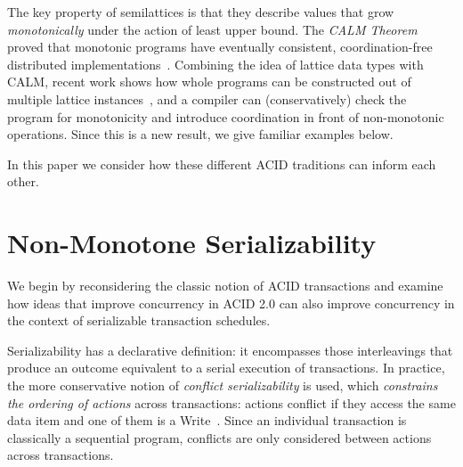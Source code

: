 \documentclass{sig-alternate}
\newcommand{\jmh}[1]{{\textcolor{red}{#1 -- jmh}}}
\newcommand{\paa}[1]{{\textcolor{blue}{[[#1 -- paa]]}}}
\begin{document}
The key property of semilattices is that they describe values that grow
\emph{monotonically} under the action of least upper bound.  The \emph{CALM
  Theorem} proved that monotonic programs have eventually consistent,
coordination-free distributed
implementations~\cite{Alvaro2011,Ameloot2011,Hellerstein2010}.  Combining the
idea of lattice data types with CALM, recent work shows how whole programs can
be constructed out of multiple lattice instances~\cite{Conway2012}, and a
compiler can (conservatively) check the program for monotonicity and introduce
coordination in front of non-monotonic operations.  Since this is a new result,
we give familiar examples below.

In this paper we consider how these different ACID traditions can inform each
other.

\begin{comment}
At the risk of over-simplifying, ACID transactions are often thought of
as an \emph{inter-transaction} approach, realized by \emph{enforcing an order}
that satisfies serializability.  ACID 2.0 can be thought of as an
\emph{intra-transaction} approach that \emph{tolerates disorder} when
non-deterministic orders result in deterministic outcomes.  This is not a
precise characterization as we discuss below, but it is useful for framing
discussion.  \paa{I am not sure I get/buy the inter vs. intra dichotomy.  it
  seems to me that the transactional abstraction lets you write ordered programs
  and gives a guarantee of an *extension* of that order in a "correct" global
  schedule, whereas calm asks for unordered programs and in return gives correct
  executions.  *both* allow the programmer to not explicitly reason about
  inter-xact interleavings.} \jmh{Are you equating CALM with pure monotonicity?
  Because Bloom, with non-monotonicity, does not help reasoning transactionally.
  As I discuss below, pure monotonicity is trivially serializable, but that
  doesn't really help think about most transactions.}
\end{comment}

\section{Non-Monotone Serializability}
We begin by reconsidering the classic notion of ACID transactions and examine
how ideas that improve concurrency in ACID 2.0 can also improve concurrency in
the context of serializable transaction schedules.

Serializability has a declarative definition: it encompasses those interleavings
that produce an outcome equivalent to a serial execution of transactions.  In
practice, the more conservative notion of \emph{conflict serializability} is
used, which \emph{constrains the ordering of actions} across transactions:
actions conflict if they access the same data item and one of them is a
Write~\cite{Eswaran1976}.  Since an individual transaction is classically a
sequential program, conflicts are only considered between actions across
transactions.
\end{document}
